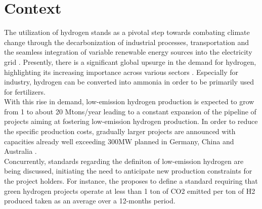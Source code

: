 \section{Context}

The utilization of hydrogen stands as a pivotal step towards combating climate change through the decarbonization of industrial processes, transportation and the seamless integration of variable renewable energy sources into the electricity grid \citep{shukla2022climate}.
Presently, there is a significant global upsurge in the demand for hydrogen, highlighting its increasing importance across various sectors \citep{iea_global_2022}. Especially for industry, hydrogen can be converted into ammonia in order to be primarily used for fertilizers. 
\\
With this rise in demand, low-emission hydrogen production is expected to grow from 1 to about 20 Mtons/year \citep{iea_global_2022} leading to a constant expansion of the pipeline of projects aiming at fostering low-emission hydrogen production. In order to reduce the specific production costs, gradually larger projects are announced with capacities already well exceeding 300MW planned in Germany, China and Australia \citep{iea_hydrogen_2023}.
\\
Concurrently, standards regarding the definiton of low-emission hydrogen are being discussed, initiating the need to anticipate new production constraints for the project holders. For instance, the \cite{green_hydrogen_organisation_green_2023} proposes to define a standard requiring that green hydrogen projects operate at less than 1 ton of CO2 emitted per ton of H2 produced taken as an average over a 12-months period.
\\

